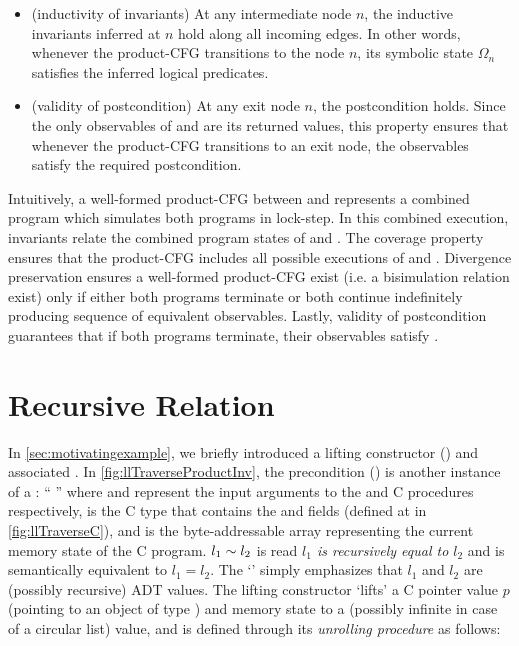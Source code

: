 \begin{itemize}
\item[] (inductivity of invariants) At any intermediate node $n$, the inductive invariants inferred at $n$
hold along all incoming edges. In other words, whenever the product-CFG transitions to the node $n$, its symbolic state $\Omega_n$
satisfies the inferred logical predicates.

\item[] (validity of postcondition) At any exit node $n$, the postcondition \post{} holds. Since the only observables of \sprog{}
and \cprog{} are its returned values, this property ensures that whenever the product-CFG transitions to an exit node,
the observables satisfy the required postcondition.
\end{itemize}

Intuitively, a well-formed product-CFG between \sprog{} and \cprog{} represents a combined program which simulates both
programs in lock-step. In this combined execution, invariants relate the combined program states of \sprog{} and \cprog{}.
The coverage property ensures that the product-CFG includes all possible executions of \sprog{} and \cprog{}.
Divergence preservation ensures a well-formed product-CFG exist (i.e. a bisimulation relation exist) only if either
both programs terminate or both continue indefinitely producing sequence of equivalent observables.
Lastly, validity of postcondition guarantees that if both programs terminate, their observables satisfy \post{}.

\section{Recursive Relation}
\label{sec:recrel}
In \cref{sec:motivatingexample}, we briefly introduced a lifting constructor ()
and associated \recursiveRelations{}.
In \cref{fig:llTraverseProductInv}, the precondition () is another instance
of a \recursiveRelation{}:
`` \indEq{} '' where  and 
represent the input arguments to the \SpecL{} and C procedures respectively,
 is the C  type that contains the  and  fields (defined at  in \cref{fig:llTraverseC}),
and \mem{} is the byte-addressable array representing the current memory state of the C program.
$l_1 \sim{} l_2$ is read {\em $l_1$ is recursively equal to $l_2$} and is semantically equivalent
to $l_1 = l_2$. The `\indEq{}' simply emphasizes that $l_1$ and $l_2$ are (possibly recursive) ADT values.
The lifting constructor  `lifts' a C pointer value $p$
(pointing to an object of type ) and
memory state \mem{} to a (possibly infinite in case of a circular list)  value,
and is defined through its {\em unrolling procedure} as follows:

